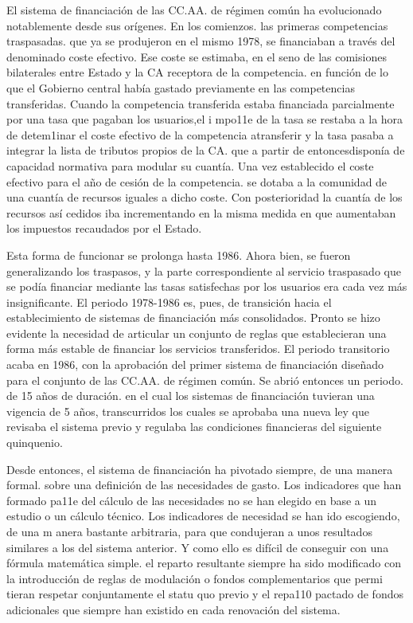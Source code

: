 \documentclass[10pt,a4paper]{article}
\begin{document}
El sistema de financiación de las CC.AA. de régimen común ha evolucionado notablemente desde sus orígenes. En los comienzos. las primeras competencias traspasadas. que ya se produjeron en el mismo 1978, se financiaban a través del denominado coste efectivo. Ese coste se estimaba, en el seno de las comisiones bilaterales entre Estado y la CA receptora de la competencia. en función de lo que el Gobierno central había gastado previamente en las competencias transferidas. Cuando la competencia transferida estaba financiada parcialmente por una tasa que pagaban los usuarios,el i mpo11e de la tasa se restaba a la hora de detem1inar el coste efectivo de la competencia atransferir y la tasa pasaba a integrar la lista de tributos propios de la CA. que a partir de entoncesdisponía de capacidad normativa para modular su cuantía. Una vez establecido el coste efectivo para el año de cesión de la competencia. se dotaba a la comunidad de una cuantía de recursos iguales a dicho coste. Con posterioridad la cuantía de los recursos así cedidos iba incrementando en la misma medida en que aumentaban los impuestos recaudados por el Estado.

Esta forma de funcionar se prolonga hasta 1986. Ahora bien, se fueron generalizando los traspasos, y la parte correspondiente al servicio traspasado que se podía financiar mediante las tasas satisfechas por los usuarios era cada vez más insignificante. El periodo 1978-1986 es, pues, de transición hacia el establecimiento de sistemas de financiación más consolidados. Pronto se hizo evidente la necesidad de articular un conjunto de reglas que establecieran una forma más estable de financiar los servicios transferidos. El periodo transitorio acaba en 1986, con la aprobación del primer sistema de financiación diseñado para el conjunto de las CC.AA. de régimen común. Se abrió entonces un periodo. de 15 años de duración. en el cual los sistemas de financiación tuvieran una vigencia de 5 años, transcurridos los cuales se aprobaba una nueva ley que revisaba el sistema previo y regulaba las condiciones financieras del siguiente quinquenio. 

Desde entonces, el sistema de financiación ha pivotado siempre, de una manera formal. sobre una definición de las necesidades de gasto. Los indicadores que han formado pa11e del cálculo de las necesidades no se han elegido en base a un estudio o un cálculo técnico. Los indicadores de necesidad se han ido escogiendo, de una m anera bastante arbitraria, para que condujeran a unos resultados similares a los del sistema anterior. Y como ello es difícil de conseguir con una fórmula matemática simple. el reparto resultante siempre ha sido modificado con la introducción de reglas de modulación o fondos complementarios que permi tieran respetar conjuntamente el statu quo previo y el repa110 pactado de fondos adicionales que siempre han existido en cada renovación del sistema.
\end{document}
